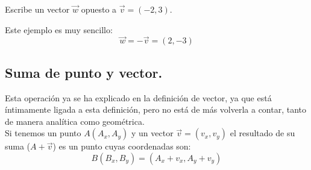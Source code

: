 \documentclass[a4paper,11pt,answers]{exam}
\begin{document}
\begin{questions}
\question Escribe un vector $\vec{w}$ opuesto a $\vec{v} = (-2,3)$.
  \begin{solution}
    Este ejemplo es muy sencillo:
    \[\vec{w} = -\vec{v} = (2,-3)\]
  \end{solution}
\end{questions}
\subsection{Suma de punto y vector.} \label{suma_punto_vector}
Esta operación ya se ha explicado en la definición de vector, ya que está íntimamente ligada
a esta definición, pero no está de más volverla a contar, tanto de manera analítica como
geométrica.\\

Si tenemos un punto $A(A_x, A_y)$ y un vector $\vec{v}= (v_x, v_y)$ el resultado de su suma
($A + \vec{v}$) es un punto cuyas coordenadas son:
\[B(B_x,B_y) = (A_x + v_x, A_y + v_y)\]
\end{document}

